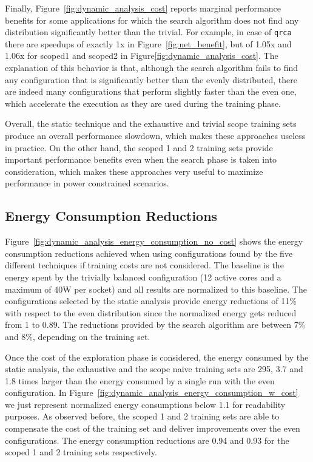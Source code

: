 Finally, Figure~\ref{fig:dynamic_analysis_cost} reports marginal performance benefits for
some applications for which the search algorithm does not find any distribution
significantly better than the trivial.  For example, in case of \texttt{qrca} there are
speedups of exactly 1x in Figure~\ref{fig:net_benefit}, but of 1.05x and 1.06x for scoped1
and scoped2 in Figure\ref{fig:dynamic_analysis_cost}.  The explanation of this behavior is
that, although the search algorithm fails to find any configuration that is significantly
better than the evenly distributed, there are indeed many configurations that perform
slightly faster than the even one, which accelerate the execution as they are used during
the training phase.

Overall, the static technique and the exhaustive and trivial scope training sets produce
an overall performance slowdown, which makes these approaches useless in practice.  On the
other hand, the scoped 1 and 2 training sets provide important performance benefits even
when the search phase is taken into consideration, which makes these approaches very
useful to maximize performance in power constrained scenarios.

\subsection{Energy Consumption Reductions}
\label{sec:energy}
Figure~\ref{fig:dynamic_analysis_energy_consumption_no_cost} shows the energy consumption
reductions achieved when using configurations found by the five different techniques if
training costs are not considered.  The baseline is the energy spent by the trivially
balanced configuration (12 active cores and a maximum of 40W per socket) and all results
are normalized to this baseline.  The configurations selected by the static analysis
provide energy reductions of 11\% with respect to the even distribution since the
normalized energy gets reduced from 1 to 0.89.  The reductions provided by the search
algorithm are between 7\% and 8\%, depending on the training set.

Once the cost of the exploration phase is considered, the energy consumed by the static
analysis, the exhaustive and the scope naive training sets are 295, 3.7 and 1.8 times
larger than the energy consumed by a single run with the even configuration.  In
Figure~\ref{fig:dynamic_analysis_energy_consumption_w_cost} we just represent normalized
energy consumptions below 1.1 for readability purposes.  As observed before, the scoped 1
and 2 training sets are able to compensate the cost of the training set and deliver
improvements over the even configurations.  The energy consumption reductions are 0.94 and
0.93 for the scoped 1 and 2 training sets respectively.
